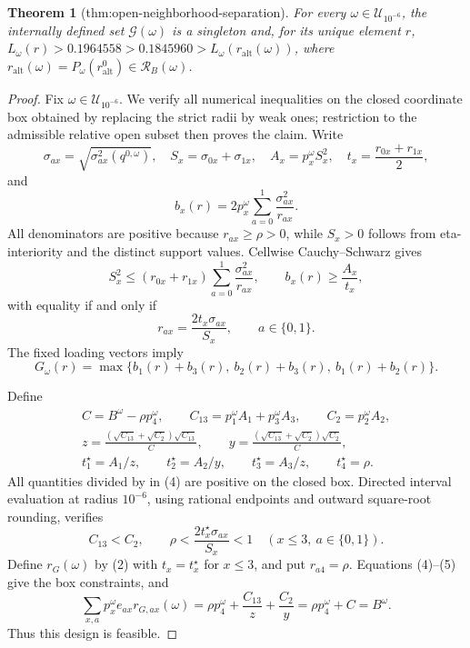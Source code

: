 \documentclass{article}
\newtheorem{theorem}{Theorem}
\begin{document}
\begin{theorem}[thm:open-neighborhood-separation]\label{thm:open-neighborhood-separation}
For every \(\omega\in\mathcal U_{10^{-6}}\), the internally defined set \(\mathcal G(\omega)\) is a singleton and, for its unique element \(r\), \(L_\omega(r)>0.1964558>0.1845960>L_\omega(r_{\mathrm{alt}}(\omega))\), where \(r_{\mathrm{alt}}(\omega)=P_\omega(r_{\mathrm{alt}}^0)\in\mathcal R_B(\omega)\).
\end{theorem}
\begin{proof}
Fix \(\omega\in\mathcal U_{10^{-6}}\).  We verify all numerical inequalities on the closed coordinate box obtained by replacing the strict radii by weak ones; restriction to the admissible relative open subset then proves the claim.  Write
\[
 \sigma_{ax}=\sqrt{\sigma^2_{ax}(q^{0,\omega})},\quad
 S_x=\sigma_{0x}+\sigma_{1x},\quad A_x=p_x^\omega S_x^2,\quad
 t_x=\frac{r_{0x}+r_{1x}}2,
\]
and
\[
 b_x(r)=2p_x^\omega\sum_{a=0}^1\frac{\sigma_{ax}^2}{r_{ax}}.
\]
All denominators are positive because \(r_{ax}\geq\rho>0\), while \(S_x>0\) follows from eta-interiority and the distinct support values.  Cellwise Cauchy--Schwarz gives
\[
 S_x^2
 \leq(r_{0x}+r_{1x})\sum_{a=0}^1\frac{\sigma_{ax}^2}{r_{ax}},\qquad
 b_x(r)\geq\frac{A_x}{t_x},                                        \tag{1}
\]
with equality if and only if
\[
 r_{ax}=\frac{2t_x\sigma_{ax}}{S_x},\qquad a\in\{0,1\}.             \tag{2}
\]
The fixed loading vectors imply
\[
 G_\omega(r)=\max\{b_1(r)+b_3(r),\ b_2(r)+b_3(r),\ b_1(r)+b_2(r)\}. \tag{3}
\]

Define
\[
 \begin{gathered}
 C=B^\omega-\rho p_4^\omega,\qquad
 C_{13}=p_1^\omega A_1+p_3^\omega A_3,\qquad C_2=p_2^\omega A_2,\\
 z=\frac{(\sqrt{C_{13}}+\sqrt{C_2})\sqrt{C_{13}}}{C},\qquad
 y=\frac{(\sqrt{C_{13}}+\sqrt{C_2})\sqrt{C_2}}{C},\\
 t_1^\star=A_1/z,\qquad t_2^\star=A_2/y,\qquad t_3^\star=A_3/z,\qquad
 t_4^\star=\rho.                                                     \tag{4}
 \end{gathered}
\]
All quantities divided by in (4) are positive on the closed box.  Directed interval evaluation at radius \(10^{-6}\), using rational endpoints and outward square-root rounding, verifies
\[
 C_{13}<C_2,\qquad
 \rho<\frac{2t_x^\star\sigma_{ax}}{S_x}<1
 \quad(x\leq3,\ a\in\{0,1\}).                                     \tag{5}
\]
Define \(r_G(\omega)\) by (2) with \(t_x=t_x^\star\) for \(x\leq3\), and put \(r_{a4}=\rho\).  Equations (4)--(5) give the box constraints, and
\[
 \sum_{x,a}p_x^\omega e_{ax}r_{G,ax}(\omega)
 =\rho p_4^\omega+\frac{C_{13}}z+\frac{C_2}y
 =\rho p_4^\omega+C=B^\omega.                                     \tag{6}
\]
Thus this design is feasible.


\end{proof}
\end{document}
